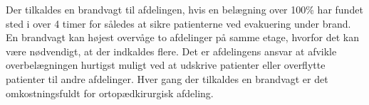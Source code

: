 Der tilkaldes en brandvagt til afdelingen, hvis en belægning over 100\% har fundet sted i over 4 timer for således at sikre patienterne ved evakuering under brand. En brandvagt kan højest overvåge to afdelinger på samme etage, hvorfor det kan være nødvendigt, at der indkaldes flere. Det er afdelingens ansvar at afvikle overbelægningen hurtigst muligt ved at udskrive patienter eller overflytte patienter til andre afdelinger. \cite{Beredskab2016}  Hver gang der tilkaldes en brandvagt er det omkostningsfuldt for ortopædkirurgisk afdeling.  


